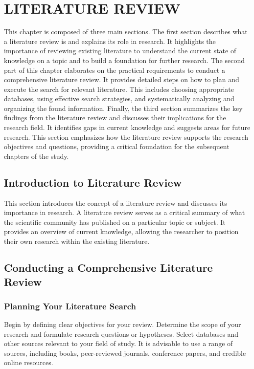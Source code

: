 \chapter{LITERATURE REVIEW}

This chapter is composed of three main sections. The first section describes what a literature review is and explains its role in research. It highlights the importance of reviewing existing literature to understand the current state of knowledge on a topic and to build a foundation for further research. The second part of this chapter elaborates on the practical requirements to conduct a comprehensive literature review. It provides detailed steps on how to plan and execute the search for relevant literature. This includes choosing appropriate databases, using effective search strategies, and systematically analyzing and organizing the found information. Finally, the third section summarizes the key findings from the literature review and discusses their implications for the research field. It identifies gaps in current knowledge and suggests areas for future research. This section emphasizes how the literature review supports the research objectives and questions, providing a critical foundation for the subsequent chapters of the study.

\section{Introduction to Literature Review}
This section introduces the concept of a literature review and discusses its importance in research. A literature review serves as a critical summary of what the scientific community has published on a particular topic or subject. It provides an overview of current knowledge, allowing the researcher to position their own research within the existing literature.

\section{Conducting a Comprehensive Literature Review}
\subsection{Planning Your Literature Search}
Begin by defining clear objectives for your review. Determine the scope of your research and formulate research questions or hypotheses. Select databases and other sources relevant to your field of study. It is advisable to use a range of sources, including books, peer-reviewed journals, conference papers, and credible online resources.

